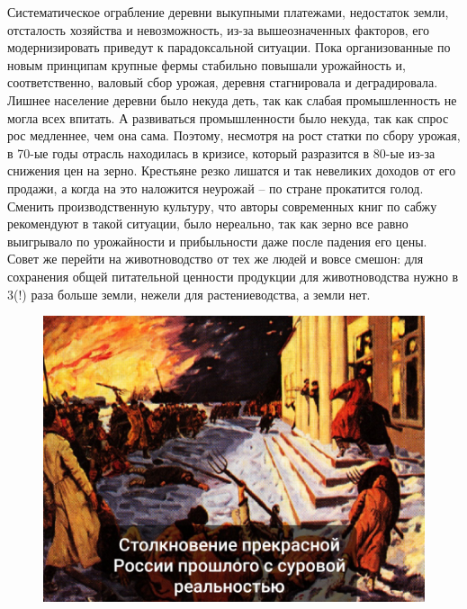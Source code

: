 Систематическое ограбление деревни выкупными платежами, недостаток земли, отсталость хозяйства и невозможность, из-за вышеозначенных факторов, его модернизировать приведут к парадоксальной ситуации. Пока организованные по новым принципам крупные фермы стабильно повышали урожайность и, соответственно, валовый сбор урожая, деревня стагнировала и деградировала. Лишнее население деревни было некуда деть, так как слабая промышленность не могла всех впитать. А развиваться промышленности было некуда, так как спрос рос медленнее, чем она сама. Поэтому, несмотря на рост статки по сбору урожая, в 70-ые годы отрасль находилась в кризисе, который разразится в 80-ые из-за снижения цен на зерно. Крестьяне резко лишатся и так невеликих доходов от его продажи, а когда на это наложится неурожай – по стране прокатится голод. Сменить производственную культуру, что авторы современных книг по сабжу рекомендуют в такой ситуации, было нереально, так как зерно все равно выигрывало по урожайности и прибыльности даже после падения его цены. Совет же перейти на животноводство от тех же людей и вовсе смешон: для сохранения общей питательной ценности продукции для животноводства нужно в 3(!) раза больше земли, нежели для растениеводства, а земли нет.
\begin{figure}[h!tb] 
	\centering\includegraphics[scale=0.5]{Agrar_vopros/oPS7LqxV2xE.jpg}
\end{figure}
